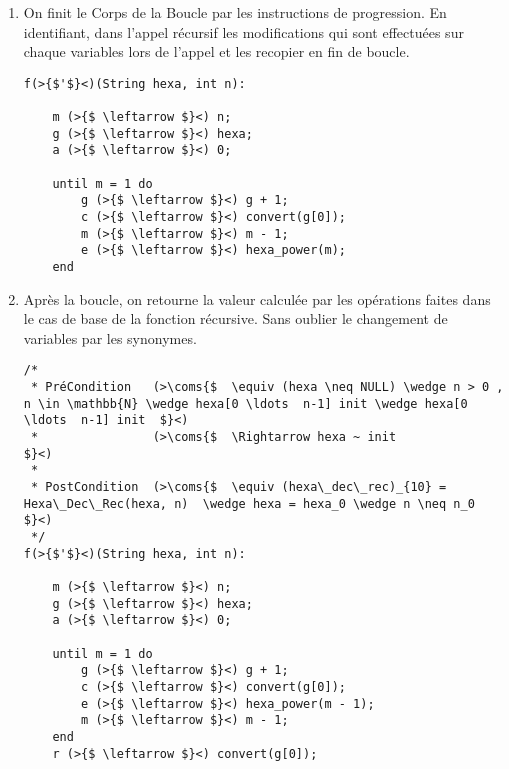 \documentclass[a4paper, 11pt, oneside]{article}
\newcommand{\coms}[1]{\textcolor{MidnightBlue}{#1}}
\begin{document}
\begin{enumerate}
			\item On finit le Corps de la Boucle par les instructions de progression. En identifiant, dans l'appel récursif les modifications qui sont effectuées
					sur chaque variables lors de l'appel et les recopier en fin de boucle.
					
			\begin{lstlisting}[caption={terminale\_4}]
f(>{$'$}<)(String hexa, int n):

	m (>{$ \leftarrow $}<) n;
	g (>{$ \leftarrow $}<) hexa;
	a (>{$ \leftarrow $}<) 0;
	
	until m = 1 do
		g (>{$ \leftarrow $}<) g + 1;
		c (>{$ \leftarrow $}<) convert(g[0]);
		m (>{$ \leftarrow $}<) m - 1;
		e (>{$ \leftarrow $}<) hexa_power(m);
	end

			\end{lstlisting} 

\newpage

			\item Après la boucle, on retourne la valeur calculée par les opérations faites dans le cas de base de la fonction récursive.
					Sans oublier le changement de variables par les synonymes.

			\begin{lstlisting}[caption={fonction non récursive}]
/*
 * PréCondition   (>\coms{$  \equiv (hexa \neq NULL) \wedge n > 0 , n \in \mathbb{N} \wedge hexa[0 \ldots  n-1] init \wedge hexa[0 \ldots  n-1] init  $}<) 
 * 				  (>\coms{$  \Rightarrow hexa ~ init																								  $}<) 
 * 
 * PostCondition  (>\coms{$  \equiv (hexa\_dec\_rec)_{10} = Hexa\_Dec\_Rec(hexa, n)  \wedge hexa = hexa_0 \wedge n \neq n_0							  $}<)
 */
f(>{$'$}<)(String hexa, int n):

	m (>{$ \leftarrow $}<) n;
	g (>{$ \leftarrow $}<) hexa;
	a (>{$ \leftarrow $}<) 0;
	
	until m = 1 do
		g (>{$ \leftarrow $}<) g + 1;
		c (>{$ \leftarrow $}<) convert(g[0]);
		e (>{$ \leftarrow $}<) hexa_power(m - 1);
		m (>{$ \leftarrow $}<) m - 1;
	end
	r (>{$ \leftarrow $}<) convert(g[0]);

			\end{lstlisting}
		\end{enumerate}
		
\end{document}
